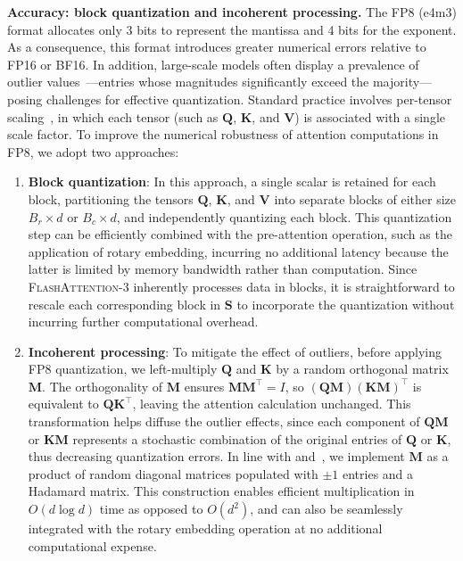 \begin{enumerate}
\textbf{Accuracy: block quantization and incoherent processing.} The FP8 (e4m3) format allocates only 3 bits to represent the mantissa and 4 bits for the exponent. As a consequence, this format introduces greater numerical errors relative to FP16 or BF16. In addition, large-scale models often display a prevalence of outlier values~\citep{dettmers2208llm,
  sun2024massive}—entries whose magnitudes significantly exceed the majority—posing challenges for effective quantization. Standard practice involves per-tensor scaling~\citep{micikevicius2022fp8}, in which each tensor (such as $\mathbf{Q}$, $\mathbf{K}$, and $\mathbf{V}$) is associated with a single scale factor. 
To improve the numerical robustness of attention computations in FP8, we adopt two approaches:

\begin{enumerate}

\item \textbf{Block quantization}: In this approach, a single scalar is retained for each block, partitioning the tensors $\mathbf{Q}$, $\mathbf{K}$, and $\mathbf{V}$ into separate blocks of either size $B_r \times d$ or $B_c \times d$, and independently quantizing each block. This quantization step can be efficiently combined with the pre-attention operation, such as the application of rotary embedding, incurring no additional latency because the latter is limited by memory bandwidth rather than computation. Since \textsc{FlashAttention-3} inherently processes data in blocks, it is straightforward to rescale each corresponding block in $\mathbf{S}$ to incorporate the quantization without incurring further computational overhead.

\item \textbf{Incoherent processing}: To mitigate the effect of outliers, before applying FP8 quantization, we left-multiply $\mathbf{Q}$ and $\mathbf{K}$ by a random orthogonal matrix $\mathbf{M}$. The orthogonality of $\mathbf{M}$ ensures $\mathbf{M} \mathbf{M}^\top = I$, so $(\mathbf{Q} \mathbf{M})(\mathbf{K} \mathbf{M})^\top$ is equivalent to $\mathbf{Q} \mathbf{K}^\top$, leaving the attention calculation unchanged. This transformation helps diffuse the outlier effects, since each component of $\mathbf{Q} \mathbf{M}$ or $\mathbf{K} \mathbf{M}$ represents a stochastic combination of the original entries of $\mathbf{Q}$ or $\mathbf{K}$, thus decreasing quantization errors. In line with \citet{chee2024quip} and~\citet{tseng2024quip}, we implement $\mathbf{M}$ as a product of random diagonal matrices populated with $\pm 1$ entries and a Hadamard matrix. This construction enables efficient multiplication in $O(d \log d)$ time as opposed to $O(d^2)$, and can also be seamlessly integrated with the rotary embedding operation at no additional computational expense.
\end{enumerate}


\end{enumerate}
